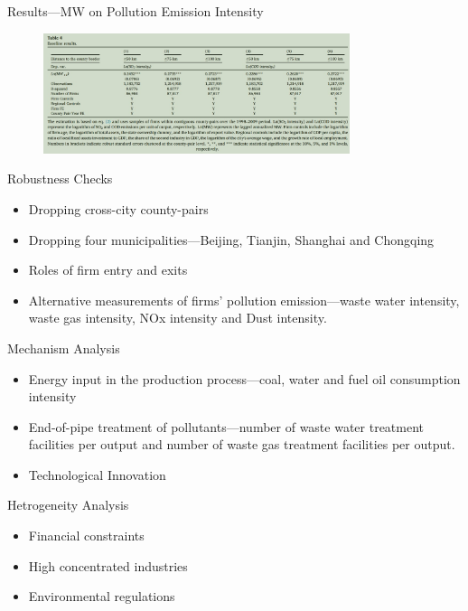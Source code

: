 \documentclass[aspectratio = 169]{beamer}
\begin{document}
    \begin{frame}{Results---MW on Pollution Emission Intensity}
        \begin{figure}
            \centering
            \includegraphics[width = 0.8\textwidth, height = 0.6\textheight]{climate_change/beamer/pol}
            \label{fig:pollution-mw}
        \end{figure}
    \end{frame}

    \begin{frame}{Robustness Checks}
        \begin{itemize}
            \item Dropping cross-city county-pairs
            \item Dropping four municipalities---Beijing, Tianjin, Shanghai and Chongqing
            \item Roles of firm entry and exits
            \item Alternative measurements of firms' pollution emission---waste water intensity, waste gas intensity, NOx intensity and Dust intensity.
        \end{itemize}
    \end{frame}

    \begin{frame}{Mechanism Analysis}
        \begin{itemize}
            \item Energy input in the production process---coal, water and fuel oil consumption intensity
            \item End-of-pipe treatment of pollutants---number of waste water treatment facilities per output and number of waste gas treatment facilities per output.
            \item Technological Innovation
        \end{itemize}
    \end{frame}

    \begin{frame}{Hetrogeneity Analysis}
        \begin{itemize}
            \item Financial constraints
            \item High concentrated industries
            \item Environmental regulations
        \end{itemize}
    \end{frame}
\end{document}
